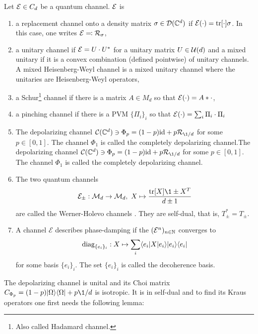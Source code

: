 \begin{definition}
    Let $\mathcal E \in C_d$ be a quantum channel. $\mathcal E$ is
    \begin{enumerate}
        \item a replacement channel onto a density matrix $\sigma \in \mathcal D(\mathbb{C}^d)$ if $\mathcal E(\cdot) =\mathrm{tr[\cdot]}\sigma$. In this case, one writes $\mathcal E \eqqcolon \mathcal R_\sigma$,
        \item a unitary channel if $\mathcal E = U \cdot U^*$ for a unitary matrix $U \in \mathcal U(d)$ and a mixed unitary if it is a convex combination (defined pointwise) of unitary channels. A mixed Heisenberg-Weyl channel is a mixed unitary channel where the unitaries are Heisenberg-Weyl operators,
        \item a Schur\footnote{Also called Hadamard channel.} channel if there is a matrix $A \in M_d$ so that $ \mathcal E(\cdot) = A *\cdot$,
        \item a pinching channel if there is a PVM $\{\Pi_i\}_i$ so that $\mathcal E(\cdot ) = \sum_i \Pi_i \cdot \Pi_i$
        \item The depolarizing channel $
    \m C(\C^d)\ni \Phi_p =(1-p)\id + p \m R_{\1/d}$
    for some $p\in[0,1]$. The channel $\Phi_1$ is called the completely depolarizing channel.The depolarizing channel $\m C(\C^d)\ni \Phi_p =(1-p)\id + p \m R_{\1/d}$ for some $p\in[0,1]$. The channel $\Phi_1$ is called the completely depolarizing channel.
    \item The two quantum channels 
        \begin{align}
            \m E_\pm :\m M_d \rightarrow \m M_d, \ X \mapsto \frac{\tr[X]\1 \pm X^T}{d\pm 1}
        \end{align}
        are called the Werner-Holevo channels \cite{Werner2002}. They are self-dual, that is, $T_\pm ^* = T_\pm$.
        \item 
A channel $\mathcal{E}$ describes phase-damping if the $(\mathcal{E}^n)_{n \in \mathbb{N}}$ converges to
\begin{align*}
    \operatorname{diag}_{\{e_i\}_i} : X \mapsto \sum_i \langle e_i\rvert X\lvert e_i\rangle \lvert e_i\rangle\langle e_i\rvert
\end{align*}
for some basis $\{e_i\}_i$. The set $\{e_i\}_i$ is called the decoherence basis.

    \end{enumerate}
\end{definition}

The depolarizing channel is unital and its Choi matrix $C_{\Phi_p} = (1-p)\pr \Omega + p\1/d$ is isotropic. It is in self-dual and to find its Kraus operators one first needs the following lemma:

